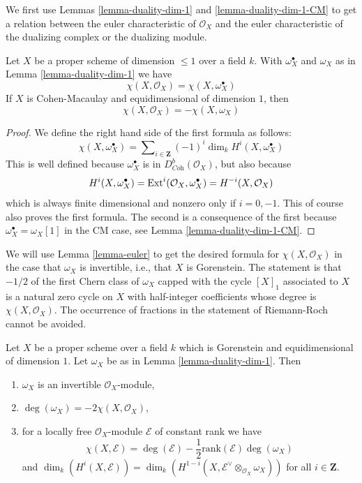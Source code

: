 \medskip\noindent
We first use Lemmas \ref{lemma-duality-dim-1} and \ref{lemma-duality-dim-1-CM}
to get a relation between the euler
characteristic of $\mathcal{O}_X$ and the euler characteristic
of the dualizing complex or the dualizing module.

\begin{lemma}
\label{lemma-euler}
Let $X$ be a proper scheme of dimension $\leq 1$ over a field $k$.
With $\omega_X^\bullet$ and $\omega_X$ as in Lemma \ref{lemma-duality-dim-1}
we have
$$
\chi(X, \mathcal{O}_X) = \chi(X, \omega_X^\bullet)
$$
If $X$ is Cohen-Macaulay and equidimensional of dimension $1$, then
$$
\chi(X, \mathcal{O}_X) = - \chi(X, \omega_X)
$$
\end{lemma}

\begin{proof}
We define the right hand side of the first formula as follows:
$$
\chi(X, \omega_X^\bullet) =
\sum\nolimits_{i \in \mathbf{Z}} (-1)^i\dim_k H^i(X, \omega_X^\bullet)
$$
This is well defined because $\omega_X^\bullet$ is in
$D^b_{\textit{Coh}}(\mathcal{O}_X)$, but also because
$$
H^i(X, \omega_X^\bullet) =
\mathop{\mathrm{Ext}}\nolimits^i(\mathcal{O}_X, \omega_X^\bullet) =
H^{-i}(X, \mathcal{O}_X)
$$
which is always finite dimensional and nonzero only if $i = 0, -1$.
This of course also proves the first formula. The second is a consequence
of the first because $\omega_X^\bullet = \omega_X[1]$ in the CM case, see
Lemma \ref{lemma-duality-dim-1-CM}.
\end{proof}

\noindent
We will use Lemma \ref{lemma-euler} to get the desired formula for
$\chi(X, \mathcal{O}_X)$ in the case that $\omega_X$ is
invertible, i.e., that $X$ is Gorenstein.
The statement is that $-1/2$ of the first Chern class of $\omega_X$
capped with the cycle $[X]_1$ associated to $X$ is a natural zero
cycle on $X$ with half-integer coefficients whose degree is
$\chi(X, \mathcal{O}_X)$.
The occurrence of fractions in the statement of Riemann-Roch cannot
be avoided.

\begin{lemma}
\label{lemma-rr}
Let $X$ be a proper scheme over a field $k$ which is Gorenstein and
equidimensional of dimension $1$. Let $\omega_X$ be as in
Lemma \ref{lemma-duality-dim-1}. Then
\begin{enumerate}
\item $\omega_X$ is an invertible $\mathcal{O}_X$-module,
\item $\deg(\omega_X) = -2\chi(X, \mathcal{O}_X)$,
\item for a locally free $\mathcal{O}_X$-module $\mathcal{E}$
of constant rank we have
$$
\chi(X, \mathcal{E}) = \deg(\mathcal{E}) -
\textstyle{\frac{1}{2}} \text{rank}(\mathcal{E}) \deg(\omega_X)
$$
and $\dim_k(H^i(X, \mathcal{E})) =
\dim_k(H^{1 - i}(X, \mathcal{E}^\vee \otimes_{\mathcal{O}_X} \omega_X))$
for all $i \in \mathbf{Z}$.
\end{enumerate}
\end{lemma}


